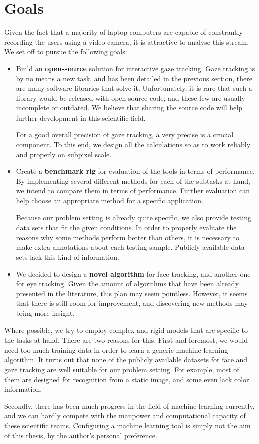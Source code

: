 \chapter{Goals}

Given the fact that a majority of laptop computers are capable of constrantly recording the users using a video camera, it is attractive to analyse this stream.
We set off to pursue the following goals:
\begin{itemize}

\item Build an \textbf{open-source} solution for interactive gaze tracking.
Gaze tracking is by no means a new task, and has been detailed in the previous section, there are many software libraries that solve it.
Unfortunately, it is rare that such a library would be released with open source code, and these few are usually incomplete or outdated.
We believe that sharing the source code will help further development in this scientific field.

For a good overall precision of gaze tracking, a very precise is a crucial component.
To this end, we design all the calculations so as to work reliably and properly on subpixel scale.

\item Create a \textbf{benchmark rig} for evaluation of the tools in terms of performance.
By implementing several different methods for each of the subtasks at hand, we intend to compare them in terms of performance.
Further evaluation can help choose an appropriate method for a specific application.

Because our problem setting is already quite specific, we also provide testing data sets that fit the given conditions.
In order to properly evaluate the reasons why some methods perform better than others, it is necessary to make extra annotations about each testing sample.
Publicly available data sets lack this kind of information.

\item We decided to design a \textbf{novel algorithm} for face tracking, and another one for eye tracking.
Given the amount of algorithms that have been already presented in the literature, this plan may seem pointless.
However, it seems that there is still room for improvement, and discovering new methods may bring more insight.

\end{itemize}

Where possible, we try to employ complex and rigid models that are specific to the tasks at hand.
There are two reasons for this.
First and foremost, we would need too much training data in order to learn a generic machine learning algorithm.
It turns out that none of the publicly available datasets for face and gaze tracking are well suitable for our problem setting.
For example, most of them are designed for recognition from a static image, and some even lack color information.

Secondly, there has been much progress in the field of machine learning currently, and we can hardly compete with the manpower and computational capacity of these scientific teams.
Configuring a machine learning tool is simply not the aim of this thesis, by the author's personal preference.
